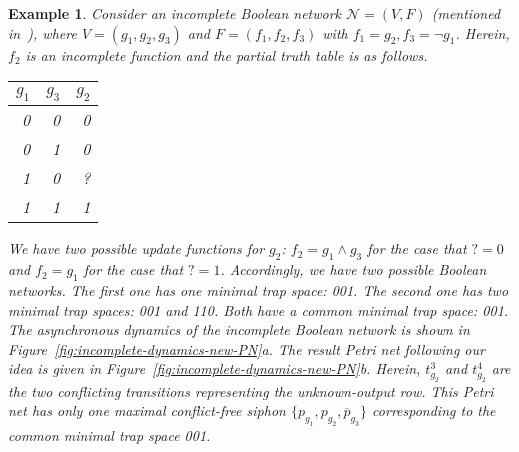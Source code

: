 \documentclass[preprint,12pt]{elsarticle}
\newtheorem{example}{Example}[section]
\begin{document}
\begin{example}
Consider an incomplete Boolean network \(\mathcal{N} = (V, F)\) (mentioned in~\cite{Steggles2006}), where \(V = (g_1, g_2, g_3)\) and \(F = (f_1, f_2, f_3)\) with \(f_1 = g_2, f_3 = \neg g_1\). Herein, \(f_2\) is an incomplete function and the partial truth table is as follows.
\begin{center}
	\begin{tabular}{rr|r}
		\toprule
		$g_1$ & $g_3$ & $g_2$ \\ \midrule
		0 & 0 & 0 \\
		0 & 1 & 0 \\
		1 & 0 & ? \\
		1 & 1 & 1 \\
		\bottomrule
	\end{tabular}
\end{center}
We have two possible update functions for \(g_2\): \(f_2 = g_1 \land g_3\) for the case that \(? = 0\) and \(f_2 = g_1\) for the case that \(? = 1\).
Accordingly, we have two possible Boolean networks.
The first one has one minimal trap space: 001.
The second one has two minimal trap spaces: 001 and 110.
Both have a common minimal trap space: 001.
The asynchronous dynamics of the incomplete Boolean network is shown in Figure~\ref{fig:incomplete-dynamics-new-PN}a.
The result Petri net following our idea is given in Figure~\ref{fig:incomplete-dynamics-new-PN}b.
Herein, \(t^3_{g_2}\) and \(t^4_{g_2}\) are the two conflicting transitions representing the unknown-output row.
This Petri net has only one maximal conflict-free siphon \(\{p_{g_1}, p_{g_2}, \overline{p}_{g_3}\}\) corresponding to the common minimal trap space 001.

\label{example:incomplete-BN}
\end{example}
\end{document}
